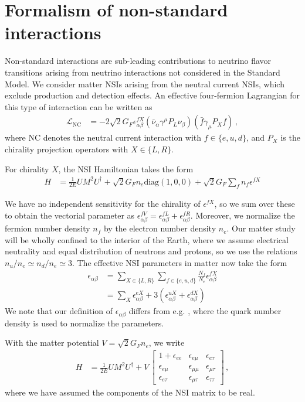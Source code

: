 \documentclass{article}
\newcommand{\ab}{\alpha\beta}
\begin{document}
\section{Formalism of non-standard interactions}\label{sec:intro} %
Non-standard interactions are sub-leading contributions to neutrino flavor transitions arising from neutrino interactions not considered in the Standard Model.
We consider matter NSIs arising from the neutral current NSIs, which exclude production 
and detection effects. An effective four-fermion Lagrangian for this type of interaction can be written as
\begin{align}
   \mathcal{L}_{\mathrm{NC}} &= -2 \sqrt{2} G_{F} \epsilon_{\alpha \beta}^{f X}\left(\bar{\nu}_{\alpha} \gamma^{\mu} P_{L} \nu_{\beta}\right)\left(\bar{f} \gamma_{\mu} P_{X} f\right)\,,
\end{align}
where NC denotes the neutral current interaction with 
$f \in \{e,u,d\}$, and $P_X$ is the chirality projection operators with $X \in \{L,R\}$.  

For chirality $X$, the NSI Hamiltonian takes the form 
\begin{align}
   H &= \frac{1}{2E} UM^2U^\dagger + \sqrt{2}G_F n_e \text{diag}(1,0,0) + \sqrt{2}G_F \sum_f n_f \epsilon^{fX}
\end{align}

We have no independent sensitivity for the chirality of $\epsilon^{fX}$, so we sum over these to obtain the vectorial parameter as $\epsilon^{fV}_{\alpha\beta} = \epsilon^{fL}_{\alpha\beta}+ \epsilon^{fR}_{\alpha\beta}$.
Moreover, we normalize the fermion number density $n_f$ by
the electron number density $n_e$. Our matter study will be wholly confined to the interior of the Earth, where we assume electrical neutrality and equal distribution of neutrons and protons, 
so we use the relations $n_u/n_e \simeq n_d/n_e \simeq 3$.
The effective NSI parameters in matter now take the form
\begin{align} \label{eq:epsilon}
    \epsilon_{\alpha\beta} &= \sum_{X \in \{L,R\}} \sum_{f \in \{e,u,d\}} \frac{N_f}{N_e} \epsilon^{fX}_{\alpha\beta} \nonumber \\
                           &= \sum_X \epsilon_{\ab}^{eX} + 3(\epsilon_{\ab}^{uX} + \epsilon_{\ab}^{dX})
\end{align}
We note that our definition of $\epsilon_{\alpha\beta}$ differs from e.g. \cite{deepcoreNSI}, where the quark number density is used to normalize
the parameters.

With the matter potential $V = \sqrt{2}G_F n_e$, we write
\begin{align} \label{eq:H_NSI}
   H &= \frac{1}{2E} UM^2U^\dagger + V\,
   \begin{bmatrix}      
      1 + \epsilon_{ee} & \epsilon_{e\mu} & \epsilon_{e\tau}  \\
      \epsilon_{e\mu} & \epsilon_{\mu\mu} & \epsilon_{\mu\tau}  \\
      \epsilon_{e \tau} & \epsilon_{\mu\tau} & \epsilon_{\tau\tau}
  \end{bmatrix}\,,
\end{align}
where we have assumed the components of the NSI matrix to be real. 
\end{document}
